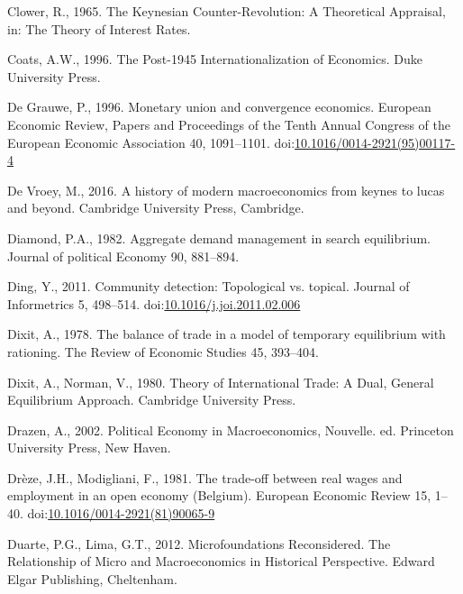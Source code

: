 \documentclass[
  12pt,
  onecolumn]{article}
\newlength{\cslhangindent}
\newlength{\cslentryspacingunit} %
\newenvironment{CSLReferences}[2] %
 {%
  \setlength{\parindent}{0pt}
  \ifodd #1
  \let\oldpar\par
  \def\par{\hangindent=\cslhangindent\oldpar}
  \fi
  \setlength{\parskip}{#2\cslentryspacingunit}
 }%
 {}
\begin{document}
\begin{CSLReferences}{1}{0}
\leavevmode{}%
Clower, R., 1965. The {Keynesian Counter-Revolution}: {A Theoretical
Appraisal}, in: The {Theory} of {Interest Rates}.

\leavevmode{}%
Coats, A.W., 1996. The Post-1945 Internationalization of Economics. Duke
University Press.

\leavevmode{}%
De Grauwe, P., 1996. Monetary union and convergence economics. European
Economic Review, Papers and {Proceedings} of the {Tenth Annual Congress}
of the {European Economic Association} 40, 1091--1101.
doi:\href{https://doi.org/10.1016/0014-2921(95)00117-4}{10.1016/0014-2921(95)00117-4}

\leavevmode{}%
De Vroey, M., 2016. A history of modern macroeconomics from keynes to
lucas and beyond. Cambridge University Press, Cambridge.

\leavevmode{}%
Diamond, P.A., 1982. Aggregate demand management in search equilibrium.
Journal of political Economy 90, 881--894.

\leavevmode{}%
Ding, Y., 2011. Community detection: {Topological} vs. topical. Journal
of Informetrics 5, 498--514.
doi:\href{https://doi.org/10.1016/j.joi.2011.02.006}{10.1016/j.joi.2011.02.006}

\leavevmode{}%
Dixit, A., 1978. The balance of trade in a model of temporary
equilibrium with rationing. The Review of Economic Studies 45, 393--404.

\leavevmode{}%
Dixit, A., Norman, V., 1980. Theory of {International Trade}: {A Dual},
{General Equilibrium Approach}. {Cambridge University Press}.

\leavevmode{}%
Drazen, A., 2002. Political {Economy} in {Macroeconomics}, Nouvelle. ed.
{Princeton University Press}, {New Haven}.

\leavevmode{}%
Drèze, J.H., Modigliani, F., 1981. The trade-off between real wages and
employment in an open economy ({Belgium}). European Economic Review 15,
1--40.
doi:\href{https://doi.org/10.1016/0014-2921(81)90065-9}{10.1016/0014-2921(81)90065-9}

\leavevmode{}%
Duarte, P.G., Lima, G.T., 2012. Microfoundations {Reconsidered}. {The
Relationship} of {Micro} and {Macroeconomics} in {Historical
Perspective}. {Edward Elgar Publishing}, {Cheltenham}.


\end{CSLReferences}
\end{document}
